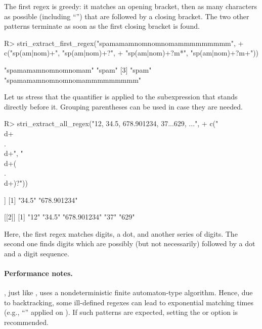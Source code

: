 \documentclass[nojss]{jss}
\begin{document}
The first regex is greedy: it matches an opening bracket,
then as many characters as possible (including ``\code{)}'')
that are followed by a closing bracket.
The two other patterns terminate as soon as the first closing
bracket is found.

\ifnotJSSversion
\begin{Schunk}
\begin{Sinput}
R> stri_extract_first_regex("spamamamnomnomnomammmmmmmmm",
+    c("sp(am|nom)+",             "sp(am|nom)+?",
+      "sp(am|nom)+?m*",          "sp(am|nom)+?m+"))
\end{Sinput}
\begin{Soutput}
[1] "spamamamnomnomnomam"         "spam"
[3] "spam"                        "spamamamnomnomnomammmmmmmmm"
\end{Soutput}
\end{Schunk}
\fi


Let us stress that the quantifier is applied to the subexpression
that stands directly before it. Grouping parentheses can be used in case
they are needed.

\begin{Schunk}
\begin{Sinput}
R> stri_extract_all_regex("12, 34.5, 678.901234, 37...629, ...",
+    c("\\d+\\.\\d+", "\\d+(\\.\\d+)?"))
\end{Sinput}
\begin{Soutput}
[[1]]
[1] "34.5"       "678.901234"

[[2]]
[1] "12"         "34.5"       "678.901234" "37"         "629"
\end{Soutput}
\end{Schunk}

Here, the first regex matches digits, a dot, and another series of digits.
The second one finds digits which are possibly (but not necessarily)
followed by a dot and a digit sequence.





\paragraph{Performance notes.}
, just like , uses a nondeterministic finite automaton-type
algorithm. Hence, due to backtracking, some ill-defined regexes can lead to
exponential matching times (e.g., ``'' applied on ).
If such patterns are expected, setting the  or 
option is recommended.
\end{document}
